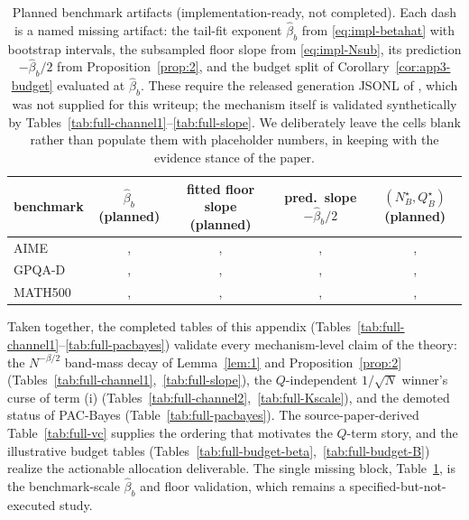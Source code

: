\documentclass{article} %
\begin{document}
\begin{table}[t]
\centering
\small
\begin{tabular}{lcccc}
\toprule
benchmark & $\widehat\beta_b$ (planned) & fitted floor slope (planned) & pred.\ slope $-\widehat\beta_b/2$ & $(N_B^\star,Q_B^\star)$ (planned) \\
\midrule
AIME    &, &, &, &, \\
GPQA-D \cite{rein2023gpqaag}  &, &, &, &, \\
MATH500 \cite{hendrycks2021measuringmp} &, &, &, &, \\
\bottomrule
\end{tabular}
\caption{Planned benchmark artifacts (implementation-ready, not completed). Each
dash is a named missing artifact: the tail-fit exponent $\widehat\beta_b$ from
\eqref{eq:impl-betahat} with bootstrap intervals, the subsampled floor slope
from \eqref{eq:impl-Nsub}, its prediction $-\widehat\beta_b/2$ from
Proposition~\ref{prop:2}, and the budget split of
Corollary~\ref{cor:app3-budget} evaluated at $\widehat\beta_b$. These require the
released generation JSONL of \cite{komiyama2026best}, which was not supplied for
this writeup; the mechanism itself is validated synthetically by
Tables~\ref{tab:full-channel1}--\ref{tab:full-slope}. We deliberately leave the
cells blank rather than populate them with placeholder numbers, in keeping with
the evidence stance of the paper.}
\label{tab:full-planned}
\end{table}

Taken together, the completed tables of this appendix
(Tables~\ref{tab:full-channel1}--\ref{tab:full-pacbayes}) validate every
mechanism-level claim of the theory: the $N^{-\beta/2}$ band-mass decay of
Lemma~\ref{lem:1} and Proposition~\ref{prop:2}
(Tables~\ref{tab:full-channel1},~\ref{tab:full-slope}), the $Q$-independent
$1/\sqrt N$ winner's curse of term (i)
(Tables~\ref{tab:full-channel2},~\ref{tab:full-Kscale}), and the demoted status
of PAC-Bayes (Table~\ref{tab:full-pacbayes}). The source-paper-derived
Table~\ref{tab:full-vc} supplies the ordering that motivates the $Q$-term
story, and the illustrative budget tables
(Tables~\ref{tab:full-budget-beta},~\ref{tab:full-budget-B}) realize the
actionable allocation deliverable. The single missing block, 
Table~\ref{tab:full-planned}, is the benchmark-scale $\widehat\beta_b$ and
floor validation, which remains a specified-but-not-executed study.



\end{document}
